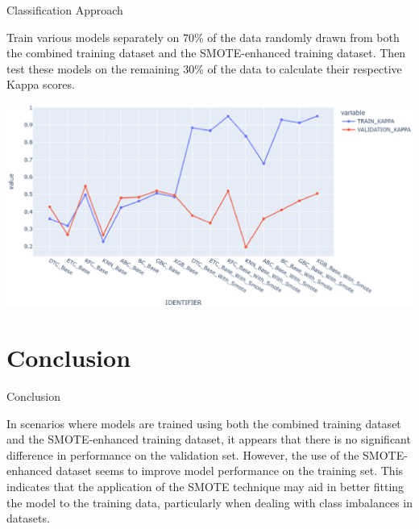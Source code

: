 \documentclass[
 size=14pt,
 paper=smartboard,  %
 mode=present, 		%
 display=slides, 	%
 style=tuliplab,  	%
 pauseslide,
 fleqn,leqno]{powerdot}
\begin{document}
\begin{slide}{Classification Approach}
	
	\begin{minipage}[c]{0.5\textwidth}
		Train various models separately on 70\% of the data randomly drawn from both the combined training dataset and the SMOTE-enhanced training dataset. Then test these models on the remaining 30\% of the data to calculate their respective Kappa scores.
	\end{minipage}
	\hfill
	\begin{minipage}[c]{0.45\textwidth}
\begin{center}
	\includegraphics[width=\textwidth]{tex/kappa}
\end{center}
	\end{minipage}
	
\end{slide}


\section{Conclusion}


\begin{slide}[toc=]{Conclusion}
	\begin{center} 
		In scenarios where models are trained using both the combined training dataset and the SMOTE-enhanced training dataset, it appears that there is no significant difference in performance on the validation set. However, the use of the SMOTE-enhanced dataset seems to improve model performance on the training set. This indicates that the application of the SMOTE technique may aid in better fitting the model to the training data, particularly when dealing with class imbalances in datasets.
	\end{center}
\end{slide}
\end{document}
